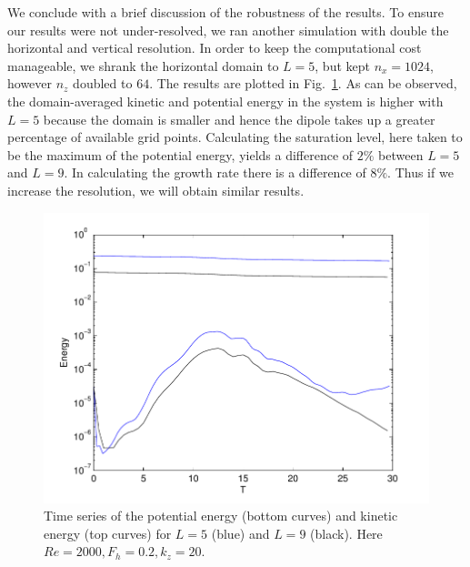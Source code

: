 We conclude with a brief discussion of the robustness of the results. To ensure our results were not under-resolved, we ran another simulation with double the horizontal and vertical resolution. In order to keep the computational cost manageable, we shrank the horizontal domain to $L=5$, but kept $n_{x}=1024$, however $n_{z}$ doubled to $64$. The results are plotted in Fig.~\ref{test_energy}. As can be observed, the domain-averaged kinetic and potential energy in the system is higher with $L=5$ because the domain is smaller and hence the dipole takes up a greater percentage of available grid points. Calculating the saturation level, here taken to be the maximum of the potential energy, yields a difference of $2\%$ between $L=5$ and $L=9$. In calculating the growth rate there is a difference of $8\%$. Thus if we increase the resolution, we will obtain similar results. 
\begin{figure}
\begin{center}
\includegraphics[width=\textwidth]{energy_test}
\caption{Time series of the potential energy (bottom curves) and kinetic energy (top curves) for $L=5$ (blue) and $L=9$ (black). Here $Re=2000, F_{h}=0.2,k_{z}=20$.}
\label{test_energy}
\end{center}
\end{figure}





